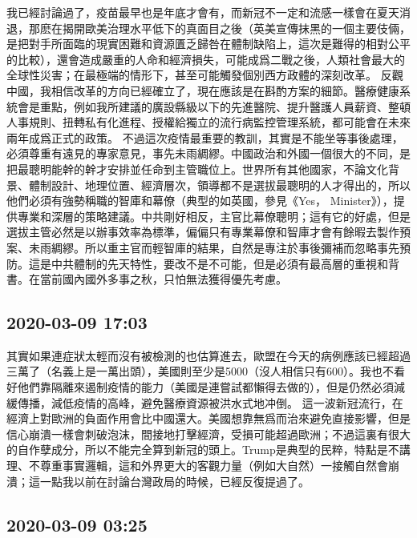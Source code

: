 \documentclass[twocolumn]{ctexart}
\begin{document}
我已經討論過了，疫苗最早也是年底才會有，而新冠不一定和流感一樣會在夏天消退，那麽在揭開歐美治理水平低下的真面目之後（英美宣傳抹黑的一個主要伎倆，是把對手所面臨的現實困難和資源匱乏歸咎在體制缺陷上，這次是難得的相對公平的比較），還會造成嚴重的人命和經濟損失，可能成爲二戰之後，人類社會最大的全球性災害；在最極端的情形下，甚至可能觸發個別西方政體的深刻改革。
反觀中國，我相信改革的方向已經確立了，現在應該是在斟酌方案的細節。醫療健康系統會是重點，例如我所建議的廣設縣級以下的先進醫院、提升醫護人員薪資、整頓人事規則、扭轉私有化進程、授權給獨立的流行病監控管理系統，都可能會在未來兩年成爲正式的政策。
不過這次疫情最重要的教訓，其實是不能坐等事後處理，必須尊重有遠見的專家意見，事先未雨綢繆。中國政治和外國一個很大的不同，是把最聰明能幹的幹才安排並任命到主管職位上。世界所有其他國家，不論文化背景、體制設計、地理位置、經濟層次，領導都不是選拔最聰明的人才得出的，所以他們必須有強勢稱職的智庫和幕僚（典型的如英國，參見《Yes， Minister》），提供專業和深層的策略建議。中共剛好相反，主官比幕僚聰明；這有它的好處，但是選拔主管必然是以辦事效率為標準，偏偏只有專業幕僚和智庫才會有餘暇去製作預案、未雨綢繆。所以重主官而輕智庫的結果，自然是專注於事後彌補而忽略事先預防。這是中共體制的先天特性，要改不是不可能，但是必須有最高層的重視和背書。在當前國內國外多事之秋，只怕無法獲得優先考慮。
\subsection*{2020-03-09 17:03}

其實如果連症狀太輕而沒有被檢測的也估算進去，歐盟在今天的病例應該已經超過三萬了（名義上是一萬出頭），美國則至少是5000（沒人相信只有600）。我也不看好他們靠隔離來遏制疫情的能力（美國是連嘗試都懶得去做的），但是仍然必須減緩傳播，減低疫情的高峰，避免醫療資源被洪水式地冲倒。
這一波新冠流行，在經濟上對歐洲的負面作用會比中國還大。美國想靠無爲而治來避免直接影響，但是信心崩潰一樣會刺破泡沫，間接地打擊經濟，受損可能超過歐洲；不過這裏有很大的自作孽成分，所以不能完全算到新冠的頭上。Trump是典型的民粹，特點是不講理、不尊重事實邏輯，這和外界更大的客觀力量（例如大自然）一接觸自然會崩潰；這一點我以前在討論台灣政局的時候，已經反復提過了。
\subsection*{2020-03-09 03:25}
\end{document}
